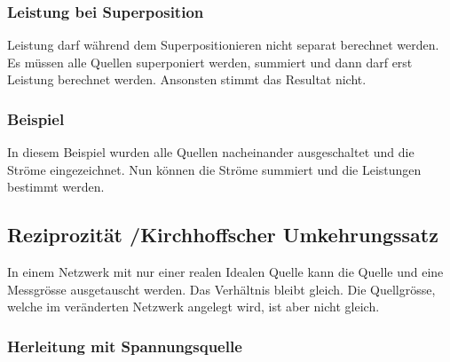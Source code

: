 \begin{center}
    
\end{center}

\subsubsection{Leistung bei Superposition}

Leistung darf während dem Superpositionieren nicht separat berechnet werden. 
Es müssen alle Quellen superponiert werden, summiert und dann darf erst Leistung berechnet werden. 
Ansonsten stimmt das Resultat nicht.

\subsubsection{Beispiel}

\begin{center}
    
\end{center}

In diesem Beispiel wurden alle Quellen nacheinander ausgeschaltet und die Ströme eingezeichnet. 
Nun können die Ströme summiert und die Leistungen bestimmt werden.
\subsection{Reziprozität /Kirchhoffscher Umkehrungssatz}


In einem Netzwerk mit nur einer realen Idealen Quelle kann die Quelle und eine Messgrösse ausgetauscht werden. 
Das Verhältnis bleibt gleich. 
Die Quellgrösse, welche im veränderten Netzwerk angelegt wird, ist aber nicht gleich.

\subsubsection{Herleitung mit Spannungsquelle}

